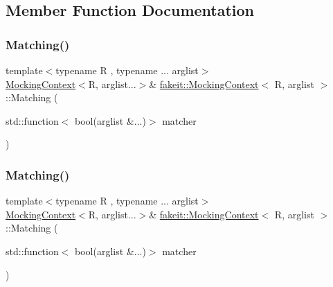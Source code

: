\subsection{Member Function Documentation}
\mbox{\label{classfakeit_1_1MockingContext_a631dd9877017e082b2e1191b02f4c17a}} 
\subsubsection{\texorpdfstring{Matching()}{Matching()}\hspace{0.1cm}{\footnotesize\ttfamily [1/9]}}
{\footnotesize\ttfamily template$<$typename R , typename ... arglist$>$ \\
\mbox{\hyperlink{classfakeit_1_1MockingContext}{Mocking\+Context}}$<$R, arglist...$>$\& \mbox{\hyperlink{classfakeit_1_1MockingContext}{fakeit\+::\+Mocking\+Context}}$<$ R, arglist $>$\+::Matching (\begin{DoxyParamCaption}\item[{std\+::function$<$ bool(arglist \&...)$>$}]{matcher }\end{DoxyParamCaption})\hspace{0.3cm}{\ttfamily [inline]}}

\mbox{\label{classfakeit_1_1MockingContext_a631dd9877017e082b2e1191b02f4c17a}} 
\subsubsection{\texorpdfstring{Matching()}{Matching()}\hspace{0.1cm}{\footnotesize\ttfamily [2/9]}}
{\footnotesize\ttfamily template$<$typename R , typename ... arglist$>$ \\
\mbox{\hyperlink{classfakeit_1_1MockingContext}{Mocking\+Context}}$<$R, arglist...$>$\& \mbox{\hyperlink{classfakeit_1_1MockingContext}{fakeit\+::\+Mocking\+Context}}$<$ R, arglist $>$\+::Matching (\begin{DoxyParamCaption}\item[{std\+::function$<$ bool(arglist \&...)$>$}]{matcher }\end{DoxyParamCaption})\hspace{0.3cm}{\ttfamily [inline]}}

